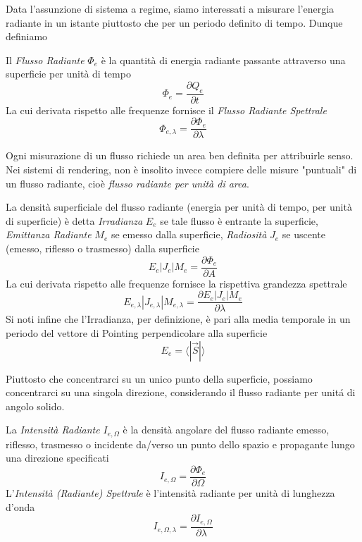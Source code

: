 Data l'assunzione di sistema a regime, siamo interessati a misurare l'energia radiante in un istante piuttosto che per un periodo definito di tempo.
Dunque definiamo
\begin{definitionS}
	Il \textit{Flusso Radiante} $\Phi_e$ \`e la quantit\`a di energia radiante passante attraverso una superficie per unit\`a di tempo
	\[ \Phi_e = \frac{\partial Q_e}{\partial t} \]
	La cui derivata rispetto alle frequenze fornisce il \textit{Flusso Radiante Spettrale}
	\[ \Phi_{e,\lambda} = \frac{\partial\Phi_e}{\partial\lambda} \]
\end{definitionS}
Ogni misurazione di un flusso richiede un area ben definita per attribuirle senso. Nei sistemi di rendering, non \`e insolito invece compiere delle 
misure "puntuali" di un flusso radiante, cio\`e \textit{flusso radiante per unit\`a di area}.
\begin{definitionS}
	La densit\`a superficiale del flusso radiante (energia per unit\`a di tempo, per unit\`a di superficie) \`e detta \textit{Irradianza} $E_e$ se tale 
	flusso \`e entrante la superficie, \textit{Emittanza Radiante} $M_e$ se emesso dalla superficie, \textit{Radiosit\`a} $J_e$ se uscente (emesso, 
	riflesso o trasmesso) dalla superficie
	\[ E_e | J_e | M_e = \frac{\partial\Phi_e}{\partial A} \]
	La cui derivata rispetto alle frequenze fornisce la rispettiva grandezza spettrale
	\[ E_{e,\lambda} | J_{e,\lambda} | M_{e,\lambda} = \frac{\partial E_e | J_e | M_e}{\partial\lambda} \]
	Si noti infine che l'Irradianza, per definizione, \`e pari alla media temporale in un periodo del vettore di Pointing perpendicolare alla 
	superficie \[ E_e = \langle |\vec{S}| \rangle \]
\end{definitionS}
Piuttosto che concentrarci su un unico punto della superficie, possiamo concentrarci su una singola direzione, considerando il flusso radiante per 
unit\'a di angolo solido.
\begin{definitionS}
	La \textit{Intensit\`a Radiante} $I_{e,\Omega}$ \`e la densit\`a angolare del flusso radiante emesso, riflesso, trasmesso o incidente da/verso un 
	punto dello spazio e propagante lungo una direzione specificati
	\[ I_{e,\Omega} = \frac{\partial\Phi_e}{\partial\Omega} \]
	L'\textit{Intensit\`a (Radiante) Spettrale} \`e l'intensit\`a radiante per unit\`a di lunghezza d'onda
	\[ I_{e,\Omega,\lambda} = \frac{\partial I_{e,\Omega}}{\partial\lambda} \]
\end{definitionS}
